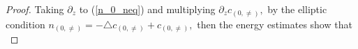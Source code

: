 \documentclass[10pt,a4paper]{amsart}
\begin{document}
	\begin{proof}
		
		Taking $\partial_z$ to (\ref{n_0_neq}) and multiplying $\partial_zc_{(0,\neq)},$
		by the elliptic condition $n_{(0,\neq)}=-\triangle c_{(0,\neq)}+c_{(0,\neq)},$
		then the energy estimates show that 
		\begin{equation}\label{n0_neq_1}

\end{equation}
\end{proof}
\end{document}
